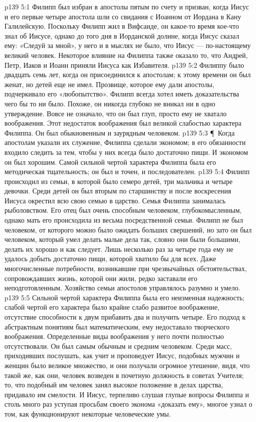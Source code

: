 \vs p139 5:1 Филипп был избран в апостолы пятым по счету и призван, когда Иисус и его первые четыре апостола шли со свидания с Иоанном от Иордана в Кану Галилейскую. Поскольку Филипп жил в Вифсаиде, он какое\hyp{}то время кое\hyp{}что знал об Иисусе, однако до того дня в Иорданской долине, когда Иисус сказал ему: «Следуй за мной», у него и в мыслях не было, что Иисус --- по\hyp{}настоящему великий человек. Некоторое влияние на Филиппа также оказало то, что Андрей, Петр, Иаков и Иоанн приняли Иисуса как Избавителя.
\vs p139 5:2 Филиппу было двадцать семь лет, когда он присоединился к апостолам; к этому времени он был женат, но детей еще не имел. Прозвище, которое ему дали апостолы, подчеркивало его «любопытство». Филипп всегда хотел иметь доказательства чего бы то ни было. Похоже, он никогда глубоко не вникал ни в одно утверждение. Вовсе не означало, что он был глуп, просто ему не хватало воображения. Этот недостаток воображения был великой слабостью характера Филиппа. Он был обыкновенным и заурядным человеком.
\vs p139 5:3 \P\ Когда апостолам указали их служение, Филиппа сделали экономом; в его обязанности входило следить за тем, чтобы у них всегда было достаточно пищи. И экономом он был хорошим. Самой сильной чертой характера Филиппа была его методическая тщательность; он был и точен, и последователен.
\vs p139 5:4 Филипп происходил из семьи, в которой было семеро детей, три мальчика и четыре девочки. Среди детей он был вторым по старшинству и после воскресения Иисуса окрестил всю свою семью в царство. Семья Филиппа занималась рыболовством. Его отец был очень способным человеком, глубокомысленным, однако мать его происходила из весьма посредственной семьи. Филипп не был человеком, от которого можно было ожидать больших свершений, но зато он был человеком, который умел делать малые дела так, словно они были большими, делать их хорошо и как следует. Лишь несколько раз за четыре года ему не удалось добыть достаточно пищи, которой хватило бы для всех. Даже многочисленные потребности, возникавшие при чрезвычайных обстоятельствах, сопровождавших жизнь, которой они жили, редко заставали его неподготовленным. Хозяйство семьи апостолов управлялось разумно и умело.
\vs p139 5:5 Сильной чертой характера Филиппа была его неизменная надежность; слабой чертой его характера было крайне слабо развитое воображение, отсутствие способности к двум прибавить два и получить четыре. Его подход к абстрактным понятиям был математическим, ему недоставало творческого воображения. Определенные виды воображения у него почти полностью отсутствовали. Он был самым обычным и средним человеком. Среди масс, приходивших послушать, как учит и проповедует Иисус, подобных мужчин и женщин было великое множество, и они получали огромное утешение, видя, что такой же, как они, человек возведен в почетную должность в советах Учителя; то, что подобный им человек занял высокое положение в делах царства, придавало им смелости. И Иисус, терпеливо слушая глупые вопросы Филиппа и столь много раз уступая просьбам своего эконома «доказать ему», многое узнал о том, как функционируют некоторые человеческие умы.
